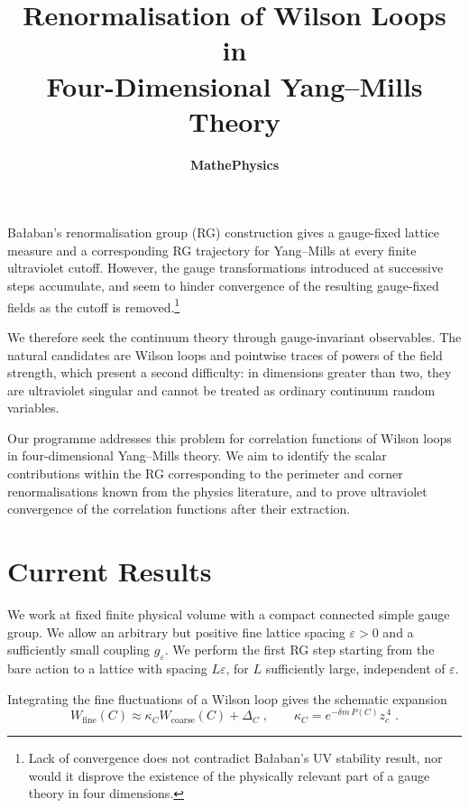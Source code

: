 \documentclass[12pt]{article}
\title{Renormalisation of Wilson Loops in\\[3pt]Four-Dimensional Yang--Mills Theory}
\author{\textbf{MathePhysics}}
\begin{document}

\maketitle





Ba{\l}aban's renormalisation group (RG) construction gives a gauge-fixed lattice measure and a corresponding RG trajectory for Yang--Mills at every finite ultraviolet cutoff. However, the gauge transformations introduced at successive steps accumulate, and seem to hinder convergence of the resulting gauge-fixed fields as the cutoff is removed.\footnote{Lack of convergence does not contradict Ba{\l}aban's UV stability result, nor would it disprove the existence of the physically relevant part of a gauge theory in four dimensions.}

We therefore seek the continuum theory through gauge-invariant observables. The natural candidates are Wilson loops and pointwise traces of powers of the field strength, which present a second difficulty: in dimensions greater than two, they are ultraviolet singular and cannot be treated as ordinary continuum random variables. 


Our programme addresses this problem for correlation functions of Wilson loops in four-dimensional Yang--Mills theory. We aim to identify the scalar contributions within the RG corresponding to the perimeter and corner renormalisations known from the physics literature, and to prove ultraviolet convergence of the correlation functions after their extraction.



\section{Current Results}

We work at fixed finite physical volume with a compact connected simple gauge group. We allow an arbitrary but positive fine lattice spacing $\varepsilon > 0$ and a sufficiently small coupling $g_\varepsilon$. We perform the first RG step starting from the bare action to a lattice with spacing $L \varepsilon$, for $L$ sufficiently large, independent of $\varepsilon$. 

Integrating the fine fluctuations of a Wilson loop gives the schematic expansion
\begin{equation*}
    W_{\mathrm{fine}}(C)\approx \kappa_C W_{\mathrm{coarse}}(C)+\Delta_C\;,\qquad
    \kappa_C=e^{-\delta m\,P(C)}z_c^{\,4}\;.
\end{equation*}
\restoregeometry
\end{document}
